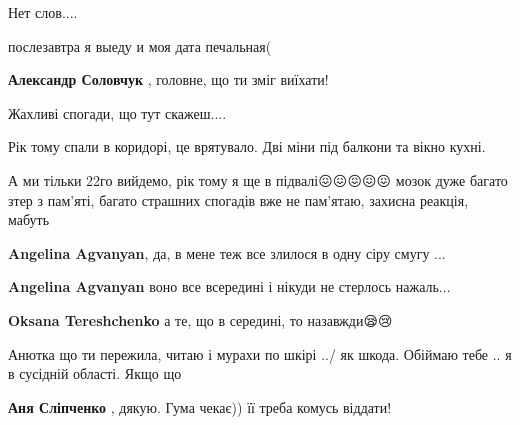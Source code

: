  
 
 
 
 

\qqSecCmt


Нет слов....


послезавтра я выеду и моя дата печальная(

\begin{itemize} %
\textbf{Александр Соловчук} , головне, що ти зміг виїхати!
\end{itemize} %


Жахливі спогади, що тут скажеш....


Рік тому спали в коридорі, це врятувало. Дві міни під балкони та вікно кухні.


А ми тільки 22го вийдемо, рік тому я ще в підвалі😖😖😖😖😖 мозок дуже багато
зтер з пам'яті, багато страшних спогадів вже не пам'ятаю, захисна реакція,
мабуть

\begin{itemize} %
\textbf{Angelina Agvanyan}, да, в мене теж все злилося в одну сіру смугу ...

\textbf{Angelina Agvanyan} воно все всередині і нікуди не стерлось нажаль...

\textbf{Oksana Tereshchenko} а те, що в середині, то назавжди😪😢

\end{itemize} %


Анютка що ти пережила, читаю і мурахи по шкірі ../ як шкода. Обіймаю тебе .. я
в сусідній області. Якщо що

\begin{itemize} %
\textbf{Аня Сліпченко} , дякую. Гума чекає)) її треба комусь віддати!
\end{itemize} %

